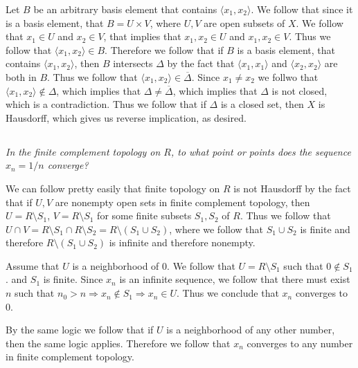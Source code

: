 \documentclass[11pt,oneside,titlepage]{book}
\DeclareMathOperator \ra {\Rightarrow}
\newcommand{\eangle}[1]{\langle #1 \rangle}
\begin{document}
Let $B$ be an arbitrary basis element that contains $\eangle{x_1, x_2}$. We follow that
since it is a basis element, that $B = U \times V$, where $U, V$ are open subsets
of $X$. We follow that $x_1 \in U$ and $x_2 \in V$, that implies that
$x_1, x_2 \in U$ and $x_1, x_2 \in V$. Thus we follow that $\eangle{x_1, x_2} \in B$.
Therefore we follow that if $B$ is a basis element, that contains $\eangle{x_1, x_2}$,
then $B$ intersects $\Delta$ by the fact that $\eangle{x_1, x_1}$ and $\eangle{x_2, x_2}$
are both in $B$. Thus we follow that $\eangle{x_1, x_2} \in \overline{\Delta}$.
Since $x_1 \neq x_2$ we follwo that $\eangle{x_1, x_2} \notin \Delta$, which implies
that $\Delta \neq \overline{\Delta}$, which implies that $\Delta$ is not closed,
which is a contradiction. Thus we follow that if $\Delta$ is a closed set,
then $X$ is Hausdorff, which gives us reverse implication, as desired.

\subsection{}

\textit{In the finite complement topology on $R$, to what point or points does
  the sequence $x_n = 1/n$ converge?}

We can follow pretty easily that finite topology  on $R$ is not Hausdorff
by the fact that if $U, V$ are nonempty open sets in finite complement topology,
then $U = R \setminus S_1$, $V = R \setminus S_1$ for some finite subsets $S_1, S_2$ of $R$.
Thus we follow that $U \cap V = R \setminus S_1 \cap R \setminus S_2 =
R \setminus (S_1 \cup S_2)$, where we follow that $S_1 \cup S_2$ is finite and therefore
$R \setminus (S_1 \cup S_2)$ is infinite and therefore nonempty.

Assume that $U$ is a neighborhood of $0$. We follow that
$U = R \setminus S_1$ such that $0 \notin S_1$. and $S_1$ is finite.
Since  $x_n$ is an infinite sequence, we follow that there must exist
$n$ such that $n_0 > n \ra x_n \notin S_1 \ra x_n \in U$. Thus we conclude that $x_n$
converges to $0$.

By the same logic we follow that if $U$ is a neighborhood of any other number, then
the same logic applies. Therefore we follow that $x_n$ converges to any number in finite
complement topology.

\subsection{}
\end{document}

